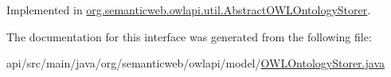 Implemented in \hyperlink{classorg_1_1semanticweb_1_1owlapi_1_1util_1_1_abstract_o_w_l_ontology_storer_a7d318e43d53fd02cf9814fb885de3ef0}{org.\-semanticweb.\-owlapi.\-util.\-Abstract\-O\-W\-L\-Ontology\-Storer}.



The documentation for this interface was generated from the following file\-:\begin{DoxyCompactItemize}
\item 
api/src/main/java/org/semanticweb/owlapi/model/\hyperlink{_o_w_l_ontology_storer_8java}{O\-W\-L\-Ontology\-Storer.\-java}\end{DoxyCompactItemize}

